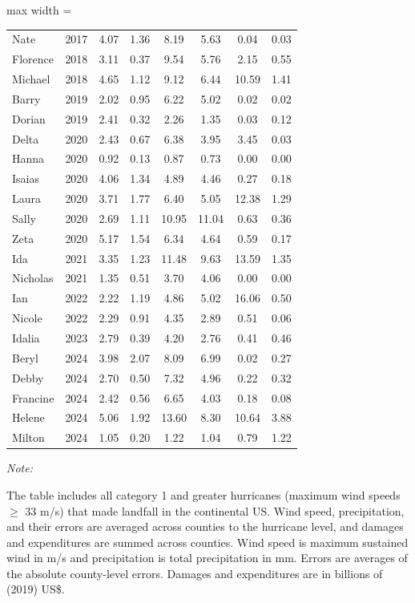 \begin{table}
\begin{adjustbox}{max width = \textwidth}
\begin{threeparttable}
\begin{tabular}[t]{lccccccc}
Nate & 2017 & 4.07 & 1.36 & 8.19 & 5.63 & 0.04 & 0.03\\
Florence & 2018 & 3.11 & 0.37 & 9.54 & 5.76 & 2.15 & 0.55\\
Michael & 2018 & 4.65 & 1.12 & 9.12 & 6.44 & 10.59 & 1.41\\
Barry & 2019 & 2.02 & 0.95 & 6.22 & 5.02 & 0.02 & 0.02\\
Dorian & 2019 & 2.41 & 0.32 & 2.26 & 1.35 & 0.03 & 0.12\\
Delta & 2020 & 2.43 & 0.67 & 6.38 & 3.95 & 3.45 & 0.03\\
Hanna & 2020 & 0.92 & 0.13 & 0.87 & 0.73 & 0.00 & 0.00\\
Isaias & 2020 & 4.06 & 1.34 & 4.89 & 4.46 & 0.27 & 0.18\\
Laura & 2020 & 3.71 & 1.77 & 6.40 & 5.05 & 12.38 & 1.29\\
Sally & 2020 & 2.69 & 1.11 & 10.95 & 11.04 & 0.63 & 0.36\\
Zeta & 2020 & 5.17 & 1.54 & 6.34 & 4.64 & 0.59 & 0.17\\
Ida & 2021 & 3.35 & 1.23 & 11.48 & 9.63 & 13.59 & 1.35\\
Nicholas & 2021 & 1.35 & 0.51 & 3.70 & 4.06 & 0.00 & 0.00\\
Ian & 2022 & 2.22 & 1.19 & 4.86 & 5.02 & 16.06 & 0.50\\
Nicole & 2022 & 2.29 & 0.91 & 4.35 & 2.89 & 0.51 & 0.06\\
Idalia & 2023 & 2.79 & 0.39 & 4.20 & 2.76 & 0.41 & 0.46\\
Beryl & 2024 & 3.98 & 2.07 & 8.09 & 6.99 & 0.02 & 0.27\\
Debby & 2024 & 2.70 & 0.50 & 7.32 & 4.96 & 0.22 & 0.32\\
Francine & 2024 & 2.42 & 0.56 & 6.65 & 4.03 & 0.18 & 0.08\\
Helene & 2024 & 5.06 & 1.92 & 13.60 & 8.30 & 10.64 & 3.88\\
Milton & 2024 & 1.05 & 0.20 & 1.22 & 1.04 & 0.79 & 1.22\\
\bottomrule
\end{tabular}
\begin{tablenotes}
\small
\item \textit{Note: } 
\item The table includes all category 1 and greater hurricanes (maximum wind speeds $\geq$ 33 m/s) that made landfall in the continental US. Wind speed, precipitation, and their errors are averaged across counties to the hurricane level, and damages and expenditures are summed across counties. Wind speed is maximum sustained wind in m/s and precipitation is total precipitation in mm. Errors are averages of the absolute county-level errors. Damages and expenditures are in billions of (2019) US\$.
\end{tablenotes}
\end{threeparttable}
\end{adjustbox}
\end{table}
